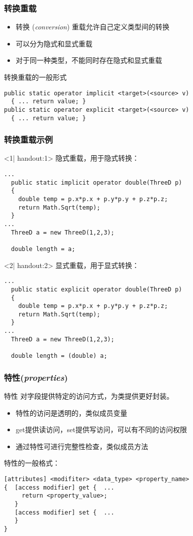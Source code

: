 \begin{frame}[fragile]
\frametitle{转换重载}
\begin{itemize}
\item 转换 (\textit{conversion}) 重载允许自己定义类型间的转换
\item 可以分为隐式和显式重载
\item 对于同一种类型，不能同时存在隐式和显式重载
\end{itemize}
转换重载的一般形式
\begin{lstlisting}
public static operator implicit <target>(<source> v)
  { ... return value; }
public static operator explicit <target>(<source> v)
  { ... return value; }
\end{lstlisting}
\end{frame}

\begin{frame}[fragile]
\frametitle{转换重载示例}
\begin{onlyenv}<1| handout:1>
隐式重载，用于隐式转换：
\begin{lstlisting}
...
  public static implicit operator double(ThreeD p)
  {
    double temp = p.x*p.x + p.y*p.y + p.z*p.z;
    return Math.Sqrt(temp);
  }
...
  ThreeD a = new ThreeD(1,2,3);

  double length = a;

\end{lstlisting}
\end{onlyenv}
\begin{onlyenv}<2| handout:2>
显式重载，用于显式转换：
\begin{lstlisting}
...
  public static explicit operator double(ThreeD p)
  {
    double temp = p.x*p.x + p.y*p.y + p.z*p.z;
    return Math.Sqrt(temp);
  }
...
  ThreeD a = new ThreeD(1,2,3);

  double length = (double) a;

\end{lstlisting}
\end{onlyenv}
\end{frame}

\begin{frame}[fragile]
\frametitle{特性(\textit{properties})}
\begin{block}{特性}
\CJKindent 对字段提供特定的访问方式，为类提供更好封装。
\end{block}
\begin{itemize}
\item 特性的访问是透明的，类似成员变量
\item get提供读访问，set提供写访问，可以有不同的访问权限
\item 通过特性可进行完整性检查，类似成员方法
\end{itemize}
特性的一般格式：
\begin{lstlisting}
[attributes] <modifiter> <data_type> <property_name>
{  [access modifier] get {  ...
     return <property_value>;
   }
   [access modifier] set {  ...  
   }
}
\end{lstlisting}
\end{frame}

